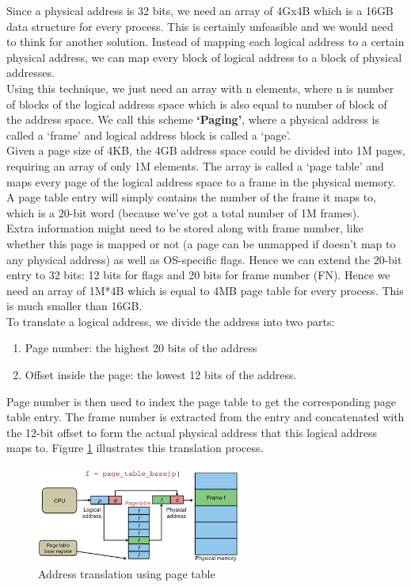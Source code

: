 \documentclass[]{scrartcl}
\begin{document}
Since a physical address is 32 bits, we need an array of 4Gx4B which
is a 16GB data structure for every process. This is certainly
unfeasible and we would need to think for another solution.
Instead of mapping each logical address to a certain physical address,
we can map every block of logical address to a block of physical addresses.\\

Using this technique, we just need an array with n elements, where
n is number of blocks of the logical address space which is also
equal to number of block of the address space. We call this scheme
\textbf{`Paging'}, where a physical address is called a `frame'
and logical address block is called a `page'. \\

Given a page size of 4KB, the 4GB address space could be divided
into 1M pages, requiring an array of only 1M elements. The array
is called a `page table' and maps every page of the logical address
space to a frame in the physical memory. A page table entry
will simply contains the number of the frame it maps to, which
is a 20-bit word (because we've got a total number of 1M frames). \\

Extra information might need to be stored along with frame number,
like whether this page is mapped or not (a page can be unmapped
if doesn't map to any physical address) as well as OS-specific flags.
Hence we can extend the 20-bit entry to 32 bits: 12 bits for flags
and 20 bits for frame number (FN). Hence we need an array of 1M*4B
which is equal to 4MB page table for every process. This is much
smaller than 16GB. \\

To translate a logical address, we divide the address into two parts:
\begin{enumerate}
\item Page number: the highest 20 bits of the address 
\item Offset inside the page: the lowest 12 bits of the address.
\end{enumerate}
Page number is then used to index the page table to get the
corresponding page table entry. The frame number is extracted
from the entry and concatenated with the 12-bit offset to form
the actual physical address that this logical address maps to.
Figure \ref{pagetable1} illustrates this translation process.

\begin{figure}[H]
\begin{center}
\includegraphics[width=0.6\textwidth]{pagetable1.png}
\end{center}
\caption{Address translation using page table}
\label{pagetable1}
\end{figure}
\end{document}
